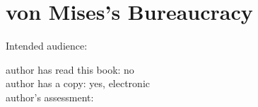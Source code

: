 \section{von Mises's Bureaucracy\label{review:vonMises_bur}}

\cite{1996_Mises}

Intended audience:

author has read this book: no\\
author has a copy: yes, electronic\\
author's assessment:
